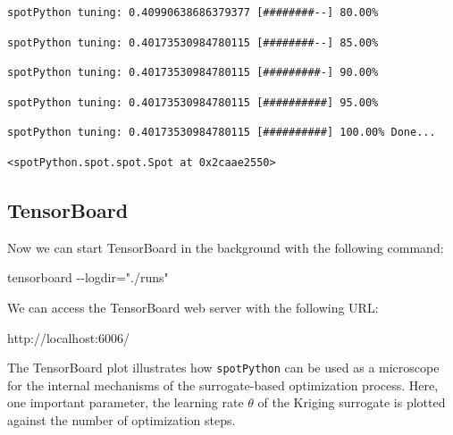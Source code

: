 \documentclass[
  letterpaper,
  DIV=11,
  numbers=noendperiod]{scrreprt}
\newenvironment{Shaded}{\begin{snugshade}}{\end{snugshade}}
\newcommand{\NormalTok}[1]{\textcolor[rgb]{0.00,0.23,0.31}{#1}}
\begin{document}
\begin{verbatim}
spotPython tuning: 0.40990638686379377 [########--] 80.00% 
\end{verbatim}

\begin{verbatim}
spotPython tuning: 0.40173530984780115 [########--] 85.00% 
\end{verbatim}

\begin{verbatim}
spotPython tuning: 0.40173530984780115 [#########-] 90.00% 
\end{verbatim}

\begin{verbatim}
spotPython tuning: 0.40173530984780115 [##########] 95.00% 
\end{verbatim}

\begin{verbatim}
spotPython tuning: 0.40173530984780115 [##########] 100.00% Done...
\end{verbatim}

\begin{verbatim}
<spotPython.spot.spot.Spot at 0x2caae2550>
\end{verbatim}

\hypertarget{tensorboard-1}{%
\subsection{TensorBoard}\label{tensorboard-1}}

Now we can start TensorBoard in the background with the following
command:

\begin{Shaded}
\begin{Highlighting}[]
\NormalTok{tensorboard {-}{-}logdir="./runs"}
\end{Highlighting}
\end{Shaded}

We can access the TensorBoard web server with the following URL:

\begin{Shaded}
\begin{Highlighting}[]
\NormalTok{http://localhost:6006/}
\end{Highlighting}
\end{Shaded}

The TensorBoard plot illustrates how \texttt{spotPython} can be used as
a microscope for the internal mechanisms of the surrogate-based
optimization process. Here, one important parameter, the learning rate
\(\theta\) of the Kriging surrogate is plotted against the number of
optimization steps.
\end{document}
